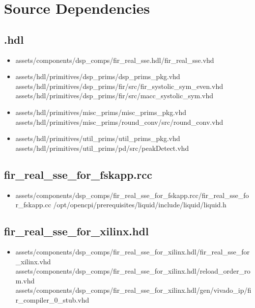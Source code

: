 \newpage

\section*{Source Dependencies}
\subsection*{\comp.hdl}
\begin{itemize}
	\item assets/components/dsp\_comps/fir\_real\_sse.hdl/fir\_real\_sse.vhd
	\item assets/hdl/primitives/dsp\_prims/dsp\_prims\_pkg.vhd
	      \subitem assets/hdl/primitives/dsp\_prims/fir/src/fir\_systolic\_sym\_even.vhd
	      \subitem assets/hdl/primitives/dsp\_prims/fir/src/macc\_systolic\_sym.vhd
	\item assets/hdl/primitives/misc\_prims/misc\_prims\_pkg.vhd
	      \subitem assets/hdl/primitives/misc\_prims/round\_conv/src/round\_conv.vhd
	\item assets/hdl/primitives/util\_prims/util\_prims\_pkg.vhd
	      \subitem assets/hdl/primitives/util\_prims/pd/src/peakDetect.vhd
\end{itemize}
\subsection*{fir\_real\_sse\_for\_fskapp.rcc}
\begin{itemize}
	\item assets/components/dsp\_comps/fir\_real\_sse\_for\_fskapp.rcc/fir\_real\_sse\_for\_fskapp.cc
	      \subitem /opt/opencpi/prerequisites/liquid/include/liquid/liquid.h
	       
\end{itemize}
\subsection*{fir\_real\_sse\_for\_xilinx.hdl}
\begin{itemize}
	\item assets/components/dsp\_comps/fir\_real\_sse\_for\_xilinx.hdl/fir\_real\_sse\_for\_xilinx.vhd
		\subitem assets/components/dsp\_comps/fir\_real\_sse\_for\_xilinx.hdl/reload\_order\_rom.vhd
		\subitem assets/components/dsp\_comps/fir\_real\_sse\_for\_xilinx.hdl/gen/vivado\_ip/fir\_compiler\_0\_stub.vhd
          
\end{itemize}


